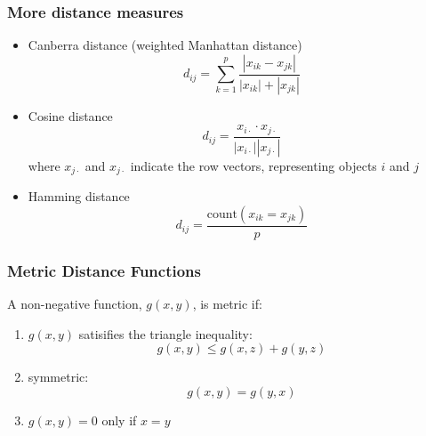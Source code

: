 \documentclass{beamer}
\begin{document}
\begin{frame}
  \frametitle{More distance measures}


\begin{itemize}

\item Canberra distance (weighted Manhattan distance)
\[
d_{ij} = \sum_{k=1}^p \frac{| x_{ik} - x_{jk} |}{|x_{ik}| + |x_{jk}|}
\]

\item Cosine distance
\[
d_{ij} = \frac{x_{i\cdot} \cdot x_{j\cdot}}{|x_{i\cdot}||x_{j\cdot}|}
\]
where $x_{j\cdot}$ and $x_{j\cdot}$ indicate the row vectors, representing objects $i$ and $j$

\item Hamming distance
\[
d_{ij} = \frac{\text{count}(x_{ik} = x_{jk})}{p}
\]

\end{itemize}
\end{frame}


\begin{frame}
  \frametitle{Metric  Distance Functions}

A non-negative function, $g(x,y)$, is \alert{metric} if:

\begin{enumerate}

\item $g(x,y)$ satisifies the triangle inequality:
\[
g(x,y) \leq  g(x,z) + g(y,z)
\]

\item symmetric:
\[
g(x,y) = g(y,x)
\] 

\item $g(x,y) =0$ only if $x = y$



\end{enumerate}
\end{frame}
\end{document}
